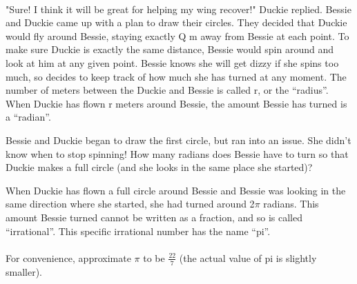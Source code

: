 \paragraph{} "Sure! I think it will be great for helping my wing recover!" Duckie replied.
\vfill
\pagebreak
 {Bessie and Duckie came up with a plan to draw their circles. They decided that Duckie would fly around Bessie, staying exactly Q m away from Bessie at each point. To make sure Duckie is exactly the same distance, Bessie would spin around and look at him at any given point. Bessie knows she will get dizzy if she spins too much, so decides to keep track of how much she has turned at any moment.}
 {}
 {The number of meters between the Duckie and Bessie is called r, or the “radius”. When Duckie has flown r meters around Bessie, the amount Bessie has turned is a “radian”.}
 {}
 {Bessie and Duckie began to draw the first circle, but ran into an issue. She didn't know when to stop spinning! How many radians does Bessie have to turn so that Duckie makes a full circle (and she looks in the same place she started)?}
 {}
 {When Duckie has flown a full circle around Bessie and Bessie was looking in the same direction where she started, she had turned around 2$\pi$ radians. This amount Bessie turned cannot be written as a fraction, and so is called “irrational”. This specific irrational number has the name “pi”. 
 \paragraph{} For convenience, approximate $\pi$ to be $\frac{22}{7}$ (the actual value of pi is slightly smaller).}
 {}
